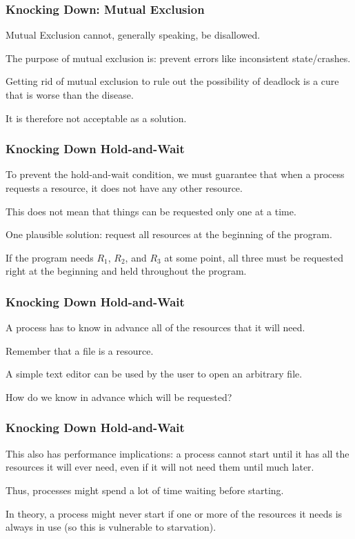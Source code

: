 \begin{frame}
\frametitle{Knocking Down: Mutual Exclusion}

Mutual Exclusion cannot, generally speaking, be disallowed. 

The purpose of  mutual exclusion is: prevent errors like inconsistent state/crashes. 

Getting rid of mutual exclusion to rule out the possibility of deadlock is a cure that is worse than the disease.

It is therefore not acceptable as a solution.


\end{frame}

\begin{frame}
\frametitle{Knocking Down Hold-and-Wait}
 To prevent the hold-and-wait condition, we must guarantee that when a process requests a resource, it does not have any other resource. 
 
This does not mean that things can be requested only one at a time.

One plausible solution: request all resources at the beginning of the program.

If the program needs $R_{1}$, $R_{2}$, and $R_{3}$ at some point, all three must be requested right at the beginning and held throughout the program.

\end{frame}

\begin{frame}
\frametitle{Knocking Down Hold-and-Wait}

A process has to know in advance all of the resources that it will need. 

Remember that a file is a resource. 

A simple text editor can be used by the user to open an arbitrary file. 

How do we know in advance which will be requested?

\end{frame}

\begin{frame}
\frametitle{Knocking Down Hold-and-Wait}

This also has performance implications: a process cannot start until it has all the resources it will ever need, even if it will not need them until much later. 

Thus, processes might spend a lot of time waiting before starting.

In theory, a process might never start if one or more of the resources it needs is always in use (so this is vulnerable to starvation).


\end{frame}


